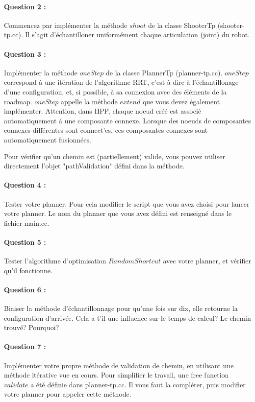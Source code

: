 \documentclass {article}
\begin{document}
\paragraph {Question 2 :}
Commencez par impl\'ementer la m\'ethode $shoot$ de la classe ShooterTp (shooter-tp.cc).
Il s'agit d'\'echantilloner uniform\'ement chaque articulation (joint) du robot.

\paragraph {Question 3 :}
Impl\'ementer la m\'ethode $oneStep$ de la classe PlannerTp (planner-tp.cc).
$oneStep$ correspond \`a une it\'eration de l'algorithme RRT, c'est \`a dire \`a l'\'echantillonage d'une configuration,
et, si possible, \`a sa connexion avec des \'el\'ements de la roadmap.
$oneStep$ appelle la m\'ethode $extend$ que vous devez \'egalement impl\'ementer.
Attention, dans HPP, chaque noeud cr\'e\'e est associ\'e automatiquement \'a une composante connexe.
Lorsque des noeuds de composantes connexes diff\'erentes sont connect'es, ces composantes connexes sont automatiquement
fusionn\'ees.

Pour v\'erifier qu'un chemin est (partiellement) valide, vous pouvez utiliser directement l'objet
"pathValidation" défini dans la méthode.

\paragraph {Question 4 :}
Tester votre planner. Pour cela modifier le script que vous avez choisi pour lancer votre planner.
Le nom du planner que vous avez d\'efini est renseign\'e dans le fichier main.cc.

\paragraph {Question 5 :}
Tester l'algorithme d'optimisation $RandomShortcut$ avec votre planner, et v\'erifier qu'il fonctionne.

\paragraph {Question 6 :}
Biaiser la m\'ethode d'\'echantillonnage pour qu'une fois sur dix, elle retourne la configuration d'arriv\'ee.
Cela a t'il une influence sur le temps de calcul? Le chemin trouv\'e?
Pourquoi?

\paragraph{Question 7 :}
Impl\'ementer votre propre m\'ethode de validation de chemin, en utilisant une m\'ethode it\'erative
vue en cours. Pour simplifier le travail, une free function $validate$ a été d\'efinie dans planner-tp.cc.
Il vous faut la compl\'eter, puis modifier votre planner pour appeler cette m\'ethode.
\end{document}
